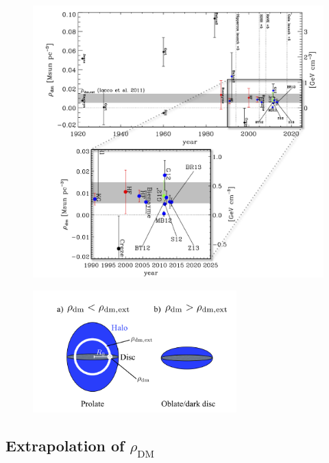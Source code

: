 \documentclass{article}
\begin{document}
\begin{figure}[h!]
    \centering
    \includegraphics[width=\textwidth]{Century.png}
    \caption{}
\end{figure}


\begin{figure}[h]
    \centering
    \includegraphics[width=0.7\textwidth]{Halo.png}
    \caption{}
\end{figure}

\subsection{Extrapolation of $\rho_\text{DM}$}
\end{document}
